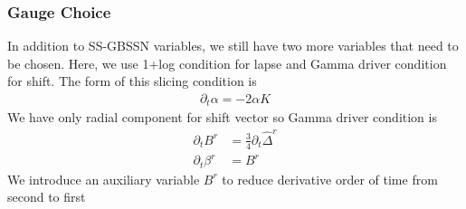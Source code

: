 \documentclass[prd]{revtex4}
\newcommand*\apost{\textsc{\char13}}
\begin{document}
\subsubsection{Gauge Choice}
In addition to SS-GBSSN variables, we still have two more variables that need to be chosen. Here, we use 1+log condition for lapse and Gamma driver condition for shift.
The form of this slicing condition is
\begin{align}
\partial_t \alpha = -2\alpha K
\end{align}
We have only radial component for shift vector so Gamma driver condition is
\begin{align}
\partial_t B^r &= \frac{3}{4} \partial_t \hat{\Delta}^r \\
\partial_t \beta^r &= B^r
\end{align}
We introduce an auxiliary variable $B^r$ to reduce derivative order of time from second to first




\end{document}
